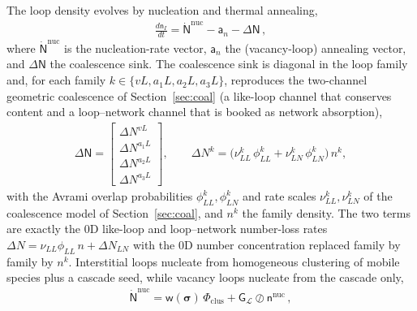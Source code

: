 \documentclass{article}
\newcommand{\spvec}[1]{\bm{\mathsf{#1}}}   %
\begin{document}
The loop density evolves by nucleation and thermal annealing,
\begin{align}\label{eq:cIode}
\frac{d\spvec{n}_I}{dt}=\dot{\spvec{N}}^{\mathrm{nuc}}-\spvec{a}_n-\Delta\spvec{N}\, ,
\end{align}
where $\dot{\spvec{N}}^{\mathrm{nuc}}$ is the nucleation-rate vector, $\spvec{a}_n$ the (vacancy-loop) annealing vector, and $\Delta\spvec{N}$ the coalescence sink. The coalescence sink is diagonal in the loop family and, for each family $k\in\{vL,a_1L,a_2L,a_3L\}$, reproduces the two-channel geometric coalescence of Section~\ref{sec:coal} (a like-loop channel that conserves content and a loop--network channel that is booked as network absorption),
\begin{align}\label{eq:DeltaN}
\Delta\spvec{N}=\begin{bmatrix}\Delta N^{vL}\\[2pt]\Delta N^{a_1L}\\[2pt]\Delta N^{a_2L}\\[2pt]\Delta N^{a_3L}\end{bmatrix},\qquad
\Delta N^{k}=\bigl(\nu_{LL}^{k}\,\phi_{LL}^{k}+\nu_{LN}^{k}\,\phi_{LN}^{k}\bigr)\,n^{k},
\end{align}
with the Avrami overlap probabilities $\phi_{LL}^{k},\phi_{LN}^{k}$ and rate scales $\nu_{LL}^{k},\nu_{LN}^{k}$ of the coalescence model of Section~\ref{sec:coal}, and $n^{k}$ the family density. The two terms are exactly the $0$D like-loop and loop--network number-loss rates $\Delta N=\nu_{LL}\phi_{LL}\,n+\Delta N_{LN}$ with the $0$D number concentration replaced family by family by $n^{k}$. Interstitial loops nucleate from homogeneous clustering of mobile species plus a cascade seed, while vacancy loops nucleate from the cascade only,
\begin{align}\label{eq:Nnuc}
\dot{\spvec{N}}^{\mathrm{nuc}}=
\spvec{w}(\bm\sigma)\,\Phi_{\mathrm{clus}}+\spvec{G}_{\mathcal{L}}\oslash\spvec{n}^{\mathrm{nuc}}\, ,
\end{align}
\end{document}
